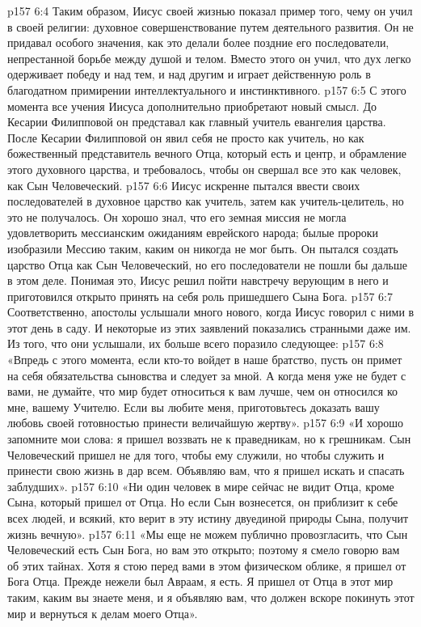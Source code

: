 \vs p157 6:4 Таким образом, Иисус своей жизнью показал пример того, чему он учил в своей религии: духовное совершенствование путем деятельного развития. Он не придавал особого значения, как это делали более поздние его последователи, непрестанной борьбе между душой и телом. Вместо этого он учил, что дух легко одерживает победу и над тем, и над другим и играет действенную роль в благодатном примирении интеллектуального и инстинктивного.
\vs p157 6:5 \pc С этого момента все учения Иисуса дополнительно приобретают новый смысл. До Кесарии Филипповой он представал как главный учитель евангелия царства. После Кесарии Филипповой он явил себя не просто как учитель, но как божественный представитель вечного Отца, который есть и центр, и обрамление этого духовного царства, и требовалось, чтобы он свершал все это как человек, как Сын Человеческий.
\vs p157 6:6 Иисус искренне пытался ввести своих последователей в духовное царство как учитель, затем как учитель\hyp{}целитель, но это не получалось. Он хорошо знал, что его земная миссия не могла удовлетворить мессианским ожиданиям еврейского народа; былые пророки изобразили Мессию таким, каким он никогда не мог быть. Он пытался создать царство Отца как Сын Человеческий, но его последователи не пошли бы дальше в этом деле. Понимая это, Иисус решил пойти навстречу верующим в него и приготовился открыто принять на себя роль пришедшего Сына Бога.
\vs p157 6:7 Соответственно, апостолы услышали много нового, когда Иисус говорил с ними в этот день в саду. И некоторые из этих заявлений показались странными даже им. Из того, что они услышали, их больше всего поразило следующее:
\vs p157 6:8 \pc «Впредь с этого момента, если кто\hyp{}то войдет в наше братство, пусть он примет на себя обязательства сыновства и следует за мной. А когда меня уже не будет с вами, не думайте, что мир будет относиться к вам лучше, чем он относился ко мне, вашему Учителю. Если вы любите меня, приготовьтесь доказать вашу любовь своей готовностью принести величайшую жертву».
\vs p157 6:9 \pc «И хорошо запомните мои слова: я пришел воззвать не к праведникам, но к грешникам. Сын Человеческий пришел не для того, чтобы ему служили, но чтобы служить и принести свою жизнь в дар всем. Объявляю вам, что я пришел искать и спасать заблудших».
\vs p157 6:10 \pc «Ни один человек в мире сейчас не видит Отца, кроме Сына, который пришел от Отца. Но если Сын вознесется, он приблизит к себе всех людей, и всякий, кто верит в эту истину двуединой природы Сына, получит жизнь вечную».
\vs p157 6:11 \pc «Мы еще не можем публично провозгласить, что Сын Человеческий есть Сын Бога, но вам это открыто; поэтому я смело говорю вам об этих тайнах. Хотя я стою перед вами в этом физическом облике, я пришел от Бога Отца. Прежде нежели был Авраам, я есть. Я пришел от Отца в этот мир таким, каким вы знаете меня, и я объявляю вам, что должен вскоре покинуть этот мир и вернуться к делам моего Отца».
